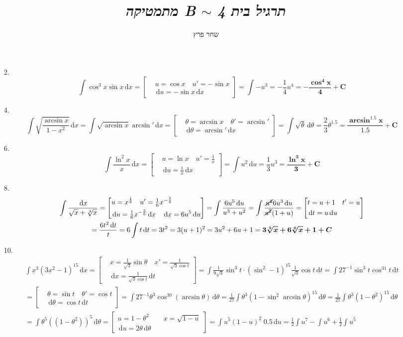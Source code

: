 \documentclass[]{article}
\author{שחר פרץ}
\title{\textit{מתמטיקה B} $\sim$ \textit{תרגיל בית 4}}
\newcommand\lnx   {\ln x}
\newcommand\cosx  {\cos x}
\newcommand\sinx  {\sin x}
\newcommand\sint  {\sin \theta}
\newcommand\dx    {\,\mathrm{d}x}
\newcommand\dt    {\,\mathrm{d}t}
\newcommand\dtt   {\,\mathrm{d}\theta}
\newcommand\du    {\,\mathrm{d}u}
\newcommand\pu[3]{\csb{\begin{aligned}
			&u = #1 \quad u' = #2 \\
			&\du = #2 #3
	\end{aligned}}}
\newcommand\ptt[3]{\csb{\begin{aligned}
			&\theta = #1 \quad \theta' = #2 \\
			&\dtt = #2 #3
\end{aligned}}}
\newcommand\ptu[3]{\csb{\begin{aligned}
			&t = #1 \quad t' = #2 \\
			&\dt = #2 \du #3
\end{aligned}}}
\newcommand\px[3]{\csb{\begin{aligned}
&x = #1 \quad x' = #2 \\
&\dx = #2 #3
\end{aligned}}}
\newcommand\ta    {\theta}
\newcommand\op    {^{-1}}
\newcommand\csb[1]    {\left [ #1 \right ]}
\begin{document}
	\maketitle
	
	\section{}
	\begin{enumerate}
		\item[2.]
			\[ \int \cos^3x \sinx \dx = \pu{\cosx}{-\sinx}{\dx} = \int -u^3 = -\frac{1}{4}u^4 = \bm{-\frac{\cos^4x}{4} + C} \]
		\item[4.] 
			\[ \int \sqrt{\frac{\arcsin x}{1 - x^2}} \dx = \int \sqrt{\arcsin x} \arcsin' \dx = \ptt{\arcsin x}{\arcsin'}{\dx} = \int \sqrt\theta \dtt = \frac{2}{3}\theta^{1.5} = \bm{\frac{\arcsin^{1.5} x}{1.5} + C} \]
		\item[6.]
			\[ \int \frac{\ln^2x}{x} \dx = \pu{\lnx}{\tfrac{1}{x}}{\dx} = \int u^2 \du = \frac{1}{3}u^3 = \bm{\frac{\ln^3x}{3} + C} \]
		\item[8.]
			\begin{multline*}
				\int \frac{\dx}{\sqrt x + \sqrt[3]{x}} = \pu{x^{\frac{1}{6}}}{\tfrac{1}{6}x^{-\frac{5}{6}}}{\dx \quad \dx = 6u^5\du } = \int \frac{6u^5\du}{u^3 + u^2} = \int \frac{\cancel{u^2}6u^3\du}{\cancel{u^2}(1 + u)} = \ptu{u + 1}{u}{} \\
				 = \frac{6t^2\dt}{t} = 6 \int t \dt = 3t^2 = 3(u + 1)^2 = 3u^2 + 6u + 1 = \bm{3\sqrt[3]{x} + 6\sqrt[6]{x} + 1 + C}
			\end{multline*}
		\item[10.]
			\begin{multline*}
				\int x^3(3x^2 - 1)^{15}\dx = \px{\tfrac{1}{\sqrt3}\sint}{\tfrac{1}{\sqrt3\cos t}}{\dt} = \int \frac{1}{9\sqrt3}\sin^3 t \cdot (\sin^2 - 1)^{15} \frac{1}{\sqrt3}\cos t\dt = \int 27\op \sin^3 t \cos^{31}t \dt \\
				= \ptt{\sin t}{\cos t}{\dt} = \int 27\op \ta^3 \cos^{30}(\arcsin \ta)\dtt = \frac{1}{27} \int \ta^3(1 - \sin^2\arcsin\ta)^{15}\dtt = \frac{1}{27} \int \ta^3(1 - \ta^2)^{15}\dtt \\
				= \int \ta^5((1 - \ta^2))^5\dtt = \csb{\begin{aligned}
						u = 1 - \ta^2 & \quad x = \sqrt{1 - u} \\
						\du = 2\ta\dtt
				\end{aligned}} = \int u^5(1 - u)^2 \; 0.5\du  = \frac{1}{2}\int u^7 - \int u^6 + \frac{1}{2} \int u^5 \\

\end{multline*}
\end{enumerate}
\end{document}
